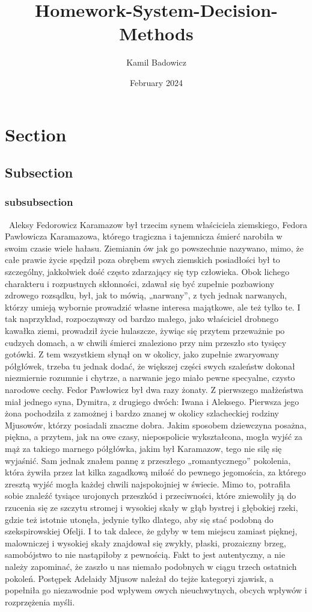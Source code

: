 \documentclass{article}
\title{Homework-System-Decision-Methods}
\author{Kamil Badowicz}
\date{February 2024}
\begin{document}
\maketitle

\tableofcontents

\section{Section}
\subsection{Subsection}
\subsubsection{subsubsection}

\cite{ref1}~Aleksy Fedorowicz Karamazow był trzecim synem właściciela ziemskiego, Fedora Pawłowicza Karamazowa, którego tragiczna i tajemnicza śmierć narobiła w swoim czasie wiele hałasu.
Ziemianin ów jak go powszechnie nazywano, mimo, że całe prawie życie spędził poza obrębem swych ziemskich posiadłości był to szczególny, jakkolwiek dość często zdarzający się typ człowieka. Obok lichego charakteru i rozpustnych skłonności, zdawał się być zupełnie pozbawiony zdrowego rozsądku, był, jak to mówią, „narwany”, z tych jednak narwanych, którzy umieją wybornie prowadzić własne interesa majątkowe, ale też tylko te. I tak naprzykład, rozpocząwszy od bardzo małego, jako właściciel drobnego kawałka ziemi, prowadził życie hulaszcze, żywiąc się przytem przeważnie po cudzych domach, a w chwili śmierci znaleziono przy nim przeszło sto tysięcy gotówki. Z tem wszystkiem słynął on w okolicy, jako zupełnie zwaryowany półgłówek, trzeba tu jednak dodać, że większej części swych szaleństw dokonał niezmiernie rozumnie i chytrze, a narwanie jego miało pewne specyalne, czysto narodowe cechy. Fedor Pawłowicz był dwa razy żonaty. Z pierwszego małżeństwa miał jednego syna, Dymitra, z drugiego dwóch: Iwana i Aleksego. Pierwsza jego żona pochodziła z zamożnej i bardzo znanej w okolicy szlacheckiej rodziny Mjusowów, którzy posiadali znaczne dobra. Jakim sposobem dziewczyna posażna, piękna, a przytem, jak na owe czasy, niepospolicie wykształcona, mogła wyjść za mąż za takiego marnego półgłówka, jakim był Karamazow, tego nie silę się wyjaśnić. Sam jednak znałem pannę z przeszłego „romantycznego” pokolenia, która żywiła przez lat kilka zagadkową miłość do pewnego jegomościa, za którego zresztą wyjść mogła każdej chwili najspokojniej w świecie. Mimo to, potrafiła sobie znaleźć tysiące urojonych przeszkód i przeciwności, które zniewoliły ją do rzucenia się ze szczytu stromej i wysokiej skały w głąb bystrej i głębokiej rzeki, gdzie też istotnie utonęła, jedynie tylko dlatego, aby się stać podobną do szekspirowskiej Ofelji. I to tak dalece, że gdyby w tem miejscu zamiast pięknej, malowniczej i wysokiej skały znajdował się zwykły, płaski, prozaiczny brzeg, samobójstwo to nie nastąpiłoby z pewnością. Fakt to jest autentyczny, a nie należy zapominać, że zaszło u nas niemało podobnych w ciągu trzech ostatnich pokoleń. Postępek Adelaidy Mjusow należał do tejże kategoryi zjawisk, a popełniła go niezawodnie pod wpływem owych nieuchwytnych, obcych wpływów i rozprzężenia myśli.
\end{document}
